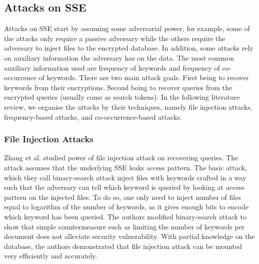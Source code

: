 \subsection{Attacks on SSE}
Attacks on SSE start by assuming some adversarial power, for example, some of the attacks only require a passive adversary while the others require the adversary to inject files to the encrypted database. In addition, some attacks rely on auxiliary information the adversary has on the data. The most common auxiliary information used are frequency of keywords and frequency of co-occurrence of keywords. There are two main attack goals. First being to recover keywords from their encryptions. Second being to recover queries from the encrypted queries (usually come as search tokens). In the following literature review, we organise the attacks by their techniques, namely file injection attacks, frequency-based attacks, and co-occurrence-based attacks.



\subsubsection{File Injection Attacks}
Zhang et al. \cite{EPRINT:ZhaKatPap16} studied power of file injection attack on recovering queries. The attack assumes that the underlying SSE leaks access pattern. The basic attack, which they call binary-search attack inject files with keywords crafted in a way such that the adversary can tell which keyword is queried by looking at access pattern on the injected files. To do so, one only need to inject number of files equal to logarithm of the number of keywords, as it gives enough bits to encode which keyword has been queried. The authors modified binary-search attack to show that simple countermeasure such as limiting the number of keywords per document does not alleviate security vulnerability. With partial knowledge on the database, the authors demonstrated that file injection attack can be mounted very efficiently and accurately.




